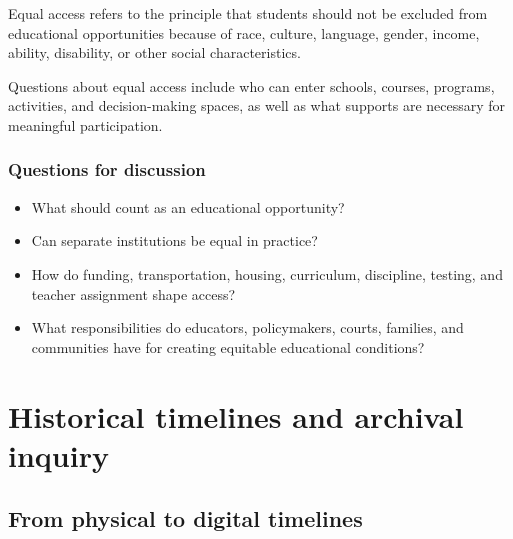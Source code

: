\documentclass[
  letterpaper,
  DIV=11,
  numbers=noendperiod]{scrartcl}
\providecommand{\tightlist}{%
  \setlength{\itemsep}{0pt}\setlength{\parskip}{0pt}}\usepackage{longtable,booktabs,array}
\begin{document}
\begin{tcolorbox}[enhanced jigsaw, colframe=quarto-callout-tip-color-frame, rightrule=.15mm, opacitybacktitle=0.6, leftrule=.75mm, colback=white, breakable, coltitle=black, arc=.35mm, bottomrule=.15mm, titlerule=0mm, left=2mm, colbacktitle=quarto-callout-tip-color!10!white, title=\textcolor{quarto-callout-tip-color}{\faLightbulb}\hspace{0.5em}{Equal access}, toprule=.15mm, bottomtitle=1mm, toptitle=1mm, opacityback=0]

Equal access refers to the principle that students should not be
excluded from educational opportunities because of race, culture,
language, gender, income, ability, disability, or other social
characteristics.

Questions about equal access include who can enter schools, courses,
programs, activities, and decision-making spaces, as well as what
supports are necessary for meaningful participation.

\end{tcolorbox}

\subsubsection{Questions for
discussion}\label{questions-for-discussion-1}

\begin{itemize}
\tightlist
\item
  What should count as an educational opportunity?
\item
  Can separate institutions be equal in practice?
\item
  How do funding, transportation, housing, curriculum, discipline,
  testing, and teacher assignment shape access?
\item
  What responsibilities do educators, policymakers, courts, families,
  and communities have for creating equitable educational conditions?
\end{itemize}

\section{Historical timelines and archival
inquiry}\label{historical-timelines-and-archival-inquiry}

\subsection{From physical to digital
timelines}\label{from-physical-to-digital-timelines}
\end{document}
